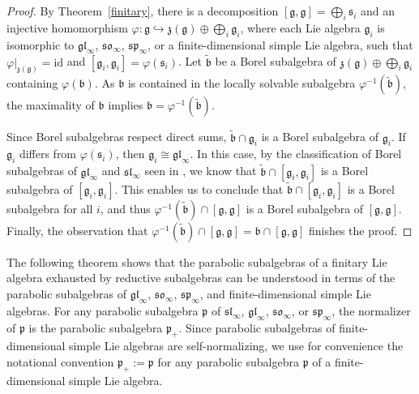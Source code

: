 \documentclass{article}
\def\b{\mathfrak {b}}
\def\gl{\mathfrak {gl}}
\def\g{\mathfrak {g}}
\def\p{\mathfrak {p}}
\def\sl{\mathfrak{sl}}
\def\so{\mathfrak{so}}
\def\sp{\mathfrak{sp}}
\def\z{\mathfrak {z}}
\def\s{\mathfrak{s}}
\begin{document}
\begin{proof}
By Theorem~\ref{finitary}, there is a decomposition $[\g,\g] = \bigoplus_i \s_i$ and an injective homomorphism $\varphi \colon \g \hookrightarrow \z(\g) \oplus \bigoplus_i \g_i$, where each Lie algebra $\g_i$ is isomorphic to $\gl_\infty$, $\so_\infty$, $\sp_\infty$, or a finite-dimensional simple Lie algebra, such that $\varphi|_{\z(\g)} = \mathrm{id}$ and $[\g_i,\g_i] = \varphi(\s_i)$.  
Let $\tilde{\b}$ be a Borel subalgebra of $\z(\g) \oplus \bigoplus_i \g_i$ containing $\varphi(\b)$.  As $\b$ is contained in the locally solvable subalgebra $\varphi^{-1} (\tilde{\b})$, the maximality of $\b$ implies $\b = \varphi^{-1}(\tilde{\b})$.  

Since Borel subalgebras respect direct sums, $\tilde{\b} \cap \g_i$ is a Borel subalgebra of $\g_i$.  If $\g_i$ differs from $\varphi(\s_i)$, then $\g_i \cong \gl_\infty$.  In this case, by the classification of Borel subalgebras of $\gl_\infty$ and $\sl_\infty$ seen in \cite{D}, we know that $\tilde{\b} \cap [\g_i , \g_i]$ is a Borel subalgebra of $[\g_i , \g_i]$.  This enables us to conclude that $\tilde{\b} \cap [\g_i,\g_i]$ is a Borel subalgebra for all $i$, and thus $\varphi^{-1} (\tilde{\b}) \cap [\g,\g]$ is a Borel subalgebra of $[\g,\g]$.  Finally, the observation that $\varphi^{-1} (\tilde{\b}) \cap [\g,\g] = \b \cap [\g,\g]$ finishes the proof.
\end{proof}


The following theorem shows that the parabolic subalgebras of a finitary Lie algebra exhausted by reductive subalgebras can be understood in terms of the parabolic subalgebras of $\gl_\infty$, $\so_\infty$, $\sp_\infty$, and finite-dimensional simple Lie algebras.  For any parabolic subalgebra $\p$ of $\sl_\infty$, $\gl_\infty$, $\so_\infty$, or $\sp_\infty$, the normalizer of $\p$ is the parabolic subalgebra $\p_+$.  Since parabolic subalgebras of finite-dimensional simple Lie algebras are self-normalizing, we use for convenience the notational convention $\p_+ := \p$ for any parabolic subalgebra $\p$ of a finite-dimensional simple Lie algebra.
\end{document}

